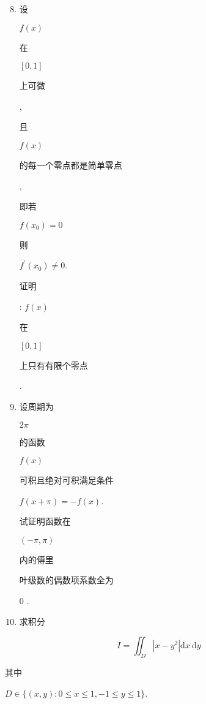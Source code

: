 \documentclass[10pt]{article}
\begin{document}
\begin{enumerate}
  \setcounter{enumi}{7}
  \item \begin{CJK}{UTF8}{mj}设\end{CJK} $f(x)$ \begin{CJK}{UTF8}{mj}在\end{CJK} $[0,1]$ \begin{CJK}{UTF8}{mj}上可微\end{CJK}, \begin{CJK}{UTF8}{mj}且\end{CJK} $f(x)$ \begin{CJK}{UTF8}{mj}的每一个零点都是简单零点\end{CJK}, \begin{CJK}{UTF8}{mj}即若\end{CJK} $f\left(x_{0}\right)=0$ \begin{CJK}{UTF8}{mj}则\end{CJK} $f^{\prime}\left(x_{0}\right) \neq 0$. \begin{CJK}{UTF8}{mj}证明\end{CJK}: $f(x)$ \begin{CJK}{UTF8}{mj}在\end{CJK} $[0,1]$ \begin{CJK}{UTF8}{mj}上只有有限个零点\end{CJK}.

  \item \begin{CJK}{UTF8}{mj}设周期为\end{CJK} $2 \pi$ \begin{CJK}{UTF8}{mj}的函数\end{CJK} $f(x)$ \begin{CJK}{UTF8}{mj}可积且绝对可积满足条件\end{CJK} $f(x+\pi)=-f(x)$. \begin{CJK}{UTF8}{mj}试证明函数在\end{CJK} $(-\pi, \pi)$ \begin{CJK}{UTF8}{mj}内的傅里\end{CJK} \begin{CJK}{UTF8}{mj}叶级数的偶数项系数全为\end{CJK} 0 .

  \item \begin{CJK}{UTF8}{mj}求积分\end{CJK}

\end{enumerate}
$$
I=\iint_{D}\left|x-y^{2}\right| \mathrm{d} x \mathrm{~d} y
$$
\begin{CJK}{UTF8}{mj}其中\end{CJK} $D \in\{(x, y): 0 \leq x \leq 1,-1 \leq y \leq 1\}$.
\end{document}
